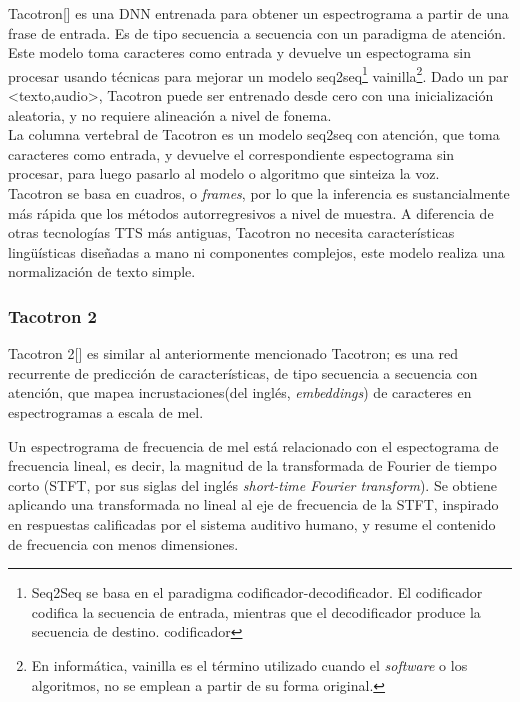 Tacotron[\cite{wang2017tacotron}] es una DNN entrenada para obtener un espectrograma a partir de una frase de entrada. Es de tipo secuencia a secuencia con un paradigma de atención. Este modelo toma caracteres como entrada y devuelve un espectograma sin procesar usando técnicas para mejorar un modelo seq2seq\footnote{Seq2Seq se basa en el paradigma codificador-decodificador. El codificador codifica la secuencia de entrada, mientras que el decodificador produce la secuencia de destino. codificador} vainilla\footnote{En informática, vainilla es el término utilizado cuando el \textit{software} o los algoritmos, no se emplean a partir de su forma original.}. Dado un par <texto,audio>, Tacotron puede ser entrenado desde cero con una inicialización aleatoria, y no requiere alineación a nivel de fonema.\\

La columna vertebral de Tacotron es un modelo seq2seq con atención, que toma caracteres como entrada, y devuelve el correspondiente espectograma sin procesar, para luego pasarlo al modelo o algoritmo que sinteiza la voz. \\

Tacotron se basa en cuadros, o \textit{frames}, por lo que la inferencia es sustancialmente más rápida que los métodos autorregresivos a nivel de muestra. A diferencia de otras tecnologías TTS más antiguas, Tacotron no necesita características lingüísticas diseñadas a mano ni componentes complejos, este modelo realiza una normalización de texto simple.


\subsubsection{Tacotron 2}

Tacotron 2[\cite{shen2018natural}] es similar al anteriormente mencionado Tacotron; es una red recurrente de predicción de características, de tipo secuencia a secuencia con atención, que mapea incrustaciones(del inglés, \textit{embeddings}) de caracteres en espectrogramas a escala de mel. 

Un espectrograma de frecuencia de mel está relacionado con el espectograma de frecuencia lineal, es decir, la magnitud de la transformada de Fourier de tiempo corto (STFT, por sus siglas del inglés \textit{short-time Fourier transform}). Se obtiene aplicando una transformada no lineal al eje de frecuencia de la STFT, inspirado en respuestas calificadas por el sistema auditivo humano, y resume el contenido de frecuencia con menos dimensiones.

